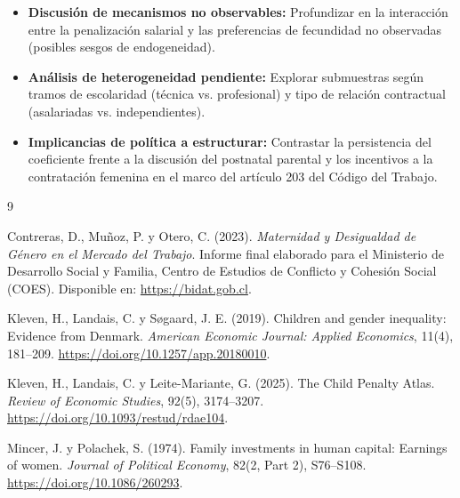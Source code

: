 \documentclass[11pt,a4paper]{article}
\begin{document}
\begin{itemize}
    \item \textbf{Discusión de mecanismos no observables:} Profundizar en la interacción entre la penalización salarial y las preferencias de fecundidad no observadas (posibles sesgos de endogeneidad).
    \item \textbf{Análisis de heterogeneidad pendiente:} Explorar submuestras según tramos de escolaridad (técnica vs. profesional) y tipo de relación contractual (asalariadas vs. independientes).
    \item \textbf{Implicancias de política a estructurar:} Contrastar la persistencia del coeficiente frente a la discusión del postnatal parental y los incentivos a la contratación femenina en el marco del artículo 203 del Código del Trabajo.
\end{itemize}

\vspace{0.5cm}

\begin{thebibliography}{9}

Contreras, D., Muñoz, P. y Otero, C. (2023). 
\textit{Maternidad y Desigualdad de Género en el Mercado del Trabajo}. 
Informe final elaborado para el Ministerio de Desarrollo Social y Familia, Centro de Estudios de Conflicto y Cohesión Social (COES). Disponible en: \url{https://bidat.gob.cl}.

Kleven, H., Landais, C. y Søgaard, J. E. (2019). 
Children and gender inequality: Evidence from Denmark. 
\textit{American Economic Journal: Applied Economics}, 11(4), 181--209. \url{https://doi.org/10.1257/app.20180010}.

Kleven, H., Landais, C. y Leite-Mariante, G. (2025). 
The Child Penalty Atlas. 
\textit{Review of Economic Studies}, 92(5), 3174--3207. \url{https://doi.org/10.1093/restud/rdae104}.

Mincer, J. y Polachek, S. (1974). 
Family investments in human capital: Earnings of women. 
\textit{Journal of Political Economy}, 82(2, Part 2), S76--S108. \url{https://doi.org/10.1086/260293}.

\end{thebibliography}
\end{document}
